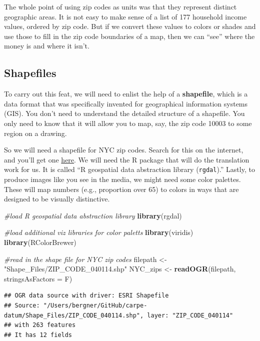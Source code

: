 \documentclass[openany]{book}
\newenvironment{Shaded}{\begin{snugshade}}{\end{snugshade}}
\newcommand{\CommentTok}[1]{\textcolor[rgb]{0.56,0.35,0.01}{\textit{#1}}}
\newcommand{\DataTypeTok}[1]{\textcolor[rgb]{0.13,0.29,0.53}{#1}}
\newcommand{\KeywordTok}[1]{\textcolor[rgb]{0.13,0.29,0.53}{\textbf{#1}}}
\newcommand{\NormalTok}[1]{#1}
\newcommand{\StringTok}[1]{\textcolor[rgb]{0.31,0.60,0.02}{#1}}
\begin{document}
The whole point of using zip codes as units was that they represent distinct geographic areas. It is not easy to make sense of a list of 177 household income values, ordered by zip code. But if we convert these values to colors or shades and use those to fill in the zip code boundaries of a map, then we can ``see'' where the money is and where it isn't.

\hypertarget{shapefiles}{%
\subsection*{Shapefiles}\label{shapefiles}}

To carry out this feat, we will need to enlist the help of a \textbf{shapefile}, which is a data format that was specifically invented for geographical information systems (GIS). You don't need to understand the detailed structure of a shapefile. You only need to know that it will allow you to map, say, the zip code 10003 to some region on a drawing.

So we will need a shapefile for NYC zip codes. Search for this on the internet, and you'll get one \href{https://catalog.data.gov/dataset/zip-code-boundaries}{here}. We will need the R package that will do the translation work for us. It is called ``R geospatial data abstraction library (\texttt{rgdal}).'' Lastly, to produce images like you see in the media, we might need some color palettes. These will map numbers (e.g., proportion over 65) to colors in ways that are designed to be visually distinctive.

\begin{Shaded}
\begin{Highlighting}[]
\CommentTok{#load R geospatial data abstraction library}
\KeywordTok{library}\NormalTok{(rgdal)}

\CommentTok{#load additional viz libraries for color paletts}
\KeywordTok{library}\NormalTok{(viridis)}
\KeywordTok{library}\NormalTok{(RColorBrewer)}

\CommentTok{#read in the shape file for NYC zip codes}
\NormalTok{filepath <-}\StringTok{ "Shape_Files/ZIP_CODE_040114.shp"}
\NormalTok{NYC_zips <-}\StringTok{ }\KeywordTok{readOGR}\NormalTok{(filepath, }\DataTypeTok{stringsAsFactors =}\NormalTok{ F)}
\end{Highlighting}
\end{Shaded}

\begin{verbatim}
## OGR data source with driver: ESRI Shapefile 
## Source: "/Users/bergner/GitHub/carpe-datum/Shape_Files/ZIP_CODE_040114.shp", layer: "ZIP_CODE_040114"
## with 263 features
## It has 12 fields
\end{verbatim}
\end{document}
